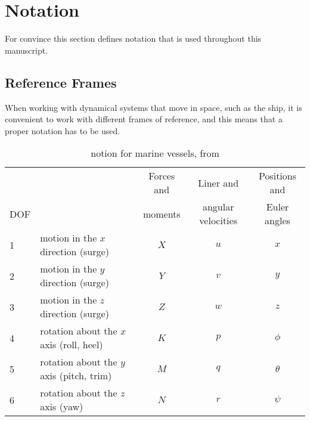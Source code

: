 \section{Notation}
For convince this section defines notation that is used throughout
this manuscript.

\subsection{Reference Frames}
When working with dynamical systems that move in space, such as the
ship, it is convenient to work with different frames of reference, and
this means that a proper notation has to be used. 

\citep{fossen}

\begin{table}[htbp]
	\centering
	\begin{tabular}{llccc}
		\toprule
		    & & Forces and & Liner and          & Positions and  \\
		DOF & & moments    & angular velocities & Euler angles   \\ 
		\midrule
		1 & motion in the $x$ direction (surge)       & $X$ & $u$ & $x$ \\
		2 & motion in the $y$ direction (surge)       & $Y$ & $v$ & $y$ \\
		3 & motion in the $z$ direction (surge)       & $Z$ & $w$ & $z$ \\
		4 & rotation about the $x$ axis (roll, heel)  & $K$ & $p$ & $\phi$ \\
		5 & rotation about the $y$ axis (pitch, trim) & $M$ & $q$ & $\theta$ \\
		6 & rotation about the $z$ axis (yaw)         & $N$ & $r$ & $\psi$ \\
		\bottomrule
	\end{tabular}
	\caption{\cite{sname1950} notion for marine vessels, from
	\citep[table~2.1]{fossen}}
	\label{tab:sname}
\end{table}

